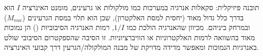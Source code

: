 \begin{theorembox}{תובנה פיזיקלית: סקאלות אנרגיה}
במערכות כמו מולקולות או גרעינים, מומנט האינרציה $I$ הוא בדרך כלל גדול מאוד (יחסית למסת האלקטרון), שכן הוא תלוי במסת הגרעינים ($M_{nuc}$) ובמרחק ביניהם.
מכיוון שהאנרגיה הולכת כמו $1/I$, רמות האנרגיה הסיבוביות () הן נמוכות מאוד בהשוואה לרמות האלקטרוניות או הוויברציוניות. זו הסיבה שהספקטרום הסיבובי שולט באנרגיות הנמוכות ומאפשר מדידה מדויקת של מבנה המולקולה/הגרעין דרך קבועי האינרציה.
\end{theorembox}